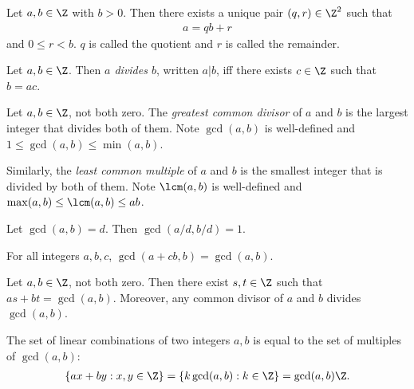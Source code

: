 \documentclass{article}
\begin{document}
\begin{theorem}
	Let $a,b\in\Z$ with $b>0$. Then there exists a unique pair $(q,r)\in\Z^2$ such that
	\begin{align*}
		a = qb + r
	\end{align*}
	and $0\leq r<b$. $q$ is called the quotient and $r$ is called the remainder.
\end{theorem}

\begin{definition}
	Let $a,b\in\Z$. Then \emph{$a$ divides $b$}, written $a|b$, iff there exists $c\in\Z$
	such that $b=ac$.
\end{definition}

\begin{definition}
	Let $a,b\in\Z$, not both zero. The \emph{greatest common divisor} of $a$ and $b$ is the largest integer
	that divides both of them. Note $\gcd(a,b)$ is well-defined and $1\leq\gcd(a,b)\leq\min(a,b)$.

	Similarly, the \emph{least common multiple} of $a$ and $b$ is the smallest
	integer that is divided by both of them. Note $\lcm(a,b)$ is well-defined
	and $\max(a,b)\leq\lcm(a,b)\leq ab$.
\end{definition}

\begin{proposition}[Boocher 3.3]
	Let $\gcd(a,b)=d$. Then $\gcd(a/d,b/d)=1$.
\end{proposition}

\begin{proposition}[Boocher 3.4]
	For all integers $a,b,c$, $\gcd(a+cb,b)=\gcd(a,b)$.
\end{proposition}

\begin{theorem}
	Let $a,b\in\Z$, not both zero. Then there exist $s,t\in\Z$ such that
	$as + bt = \gcd(a,b)$. Moreover, any common divisor of $a$ and $b$ divides $\gcd(a,b)$.
\end{theorem}

\begin{corollary}[Boocher 3.7]
	The set of linear combinations of two integers $a,b$ is equal to the set
	of multiples of $\gcd(a,b)$:
	\begin{align*}
		\{ax+by : x,y\in\Z \} = \{k\gcd(a,b):k\in\Z\}=\gcd(a,b)\Z.
	\end{align*}
\end{corollary}
\end{document}
